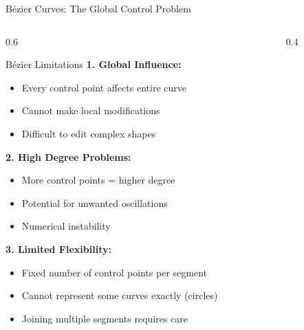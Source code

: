 \begin{frame}{Bézier Curves: The Global Control Problem}
  \begin{columns}
    \begin{column}{0.6\textwidth}
      \begin{conceptbox}{Bézier Limitations}
        \footnotesize
        \textbf{1. Global Influence:}
        \begin{itemize}
          \item Every control point affects entire curve
          \item Cannot make local modifications
          \item Difficult to edit complex shapes
        \end{itemize}

        \textbf{2. High Degree Problems:}
        \begin{itemize}
          \item More control points = higher degree
          \item Potential for unwanted oscillations
          \item Numerical instability
        \end{itemize}

        \textbf{3. Limited Flexibility:}
        \begin{itemize}
          \item Fixed number of control points per segment
          \item Cannot represent some curves exactly (circles)
          \item Joining multiple segments requires care
        \end{itemize}
      \end{conceptbox}
    \end{column}
    \begin{column}{0.4\textwidth}
      \begin{center}
\end{center}
\end{column}
\end{columns}
\end{frame}
